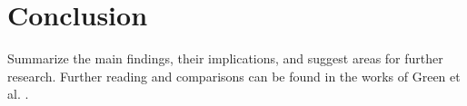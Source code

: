 \documentclass[aps,pre,reprint,groupedaddress]{revtex4-1}
\begin{document}
\section{Conclusion}
Summarize the main findings, their implications, and suggest areas for further research. Further reading and comparisons can be found in the works of Green et al. \cite{Green2016}.

\end{document}
